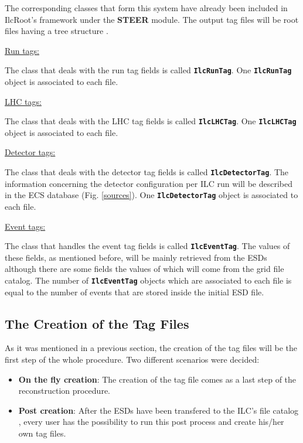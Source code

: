 \documentclass[12pt,a4paper,twoside]{article}
\newcommand{\class}[1]{\texttt{\textbf{#1}}\xspace}
\begin{document}
{The corresponding classes that form this system have already been
included in IlcRoot's framework under the
\textbf{STEER} module. The output tag files will be root files having
a tree structure \cite{EventTagWeb}.

\underline{Run tags:}

The class that deals with the run tag fields is called
\class{IlcRunTag}. One \class{IlcRunTag} object is associated to
each file.

\underline{LHC tags:}

The class that deals with the LHC tag fields is called
\class{IlcLHCTag}. One \class{IlcLHCTag} object is associated to
each file.

\underline{Detector tags:}

The class that deals with the detector tag fields is called
\class{IlcDetectorTag}. The information concerning the detector
configuration per ILC run will be described in the ECS database
(Fig. \ref{sources}). One \class{IlcDetectorTag} object is associated
to each file.

\underline{Event tags:}

The class that handles the event tag fields is called
\class{IlcEventTag}. The values of these fields, as mentioned before,
will be mainly retrieved from the ESDs although there are some fields
the values of which will come from the grid file catalog. The number
of \class{IlcEventTag} objects which are associated to each file is
equal to the number of events that are stored inside the initial ESD
file.

\subsection{The Creation of the Tag Files}

As it was mentioned in a previous section, the creation of the tag
files will be the first step of the whole procedure. Two different
scenarios were decided: 

\begin{itemize}

\item \textbf{On the fly creation}: The creation of the tag file comes
  as a last step of the reconstruction procedure.  

\item \textbf{Post creation}: After the ESDs have been transfered to
  the ILC's file catalog \cite{AliEn}, every user has the
  possibility to run this post process and create his/her own tag
  files. 


\end{itemize}}
\end{document}
